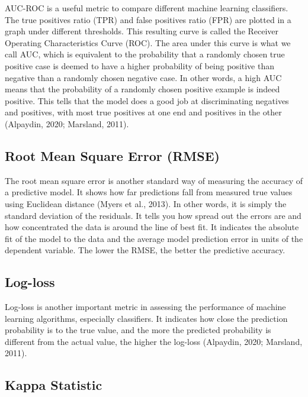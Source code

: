 \documentclass[
  jou]{apa6}
\begin{document}
AUC-ROC is a useful metric to compare different machine learning classifiers.
The true positives ratio (TPR) and false positives ratio (FPR) are plotted in a graph under different thresholds.
This resulting curve is called the Receiver Operating Characteristics Curve (ROC).
The area under this curve is what we call AUC, which is equivalent to the probability that a randomly chosen true positive case is deemed to have a higher probability of being positive than negative than a randomly chosen negative case.
In other words, a high AUC means that the probability of a randomly chosen positive example is indeed positive.
This tells that the model does a good job at discriminating negatives and positives, with most true positives at one end and positives in the other (Alpaydin, 2020; Marsland, 2011).

\hypertarget{root-mean-square-error-rmse}{%
\subsection{Root Mean Square Error (RMSE)}\label{root-mean-square-error-rmse}}

The root mean square error is another standard way of measuring the accuracy of a predictive model.
It shows how far predictions fall from measured true values using Euclidean distance (Myers et al., 2013).
In other words, it is simply the standard deviation of the residuals.
It tells you how spread out the errors are and how concentrated the data is around the line of best fit.
It indicates the absolute fit of the model to the data and the average model prediction error in units of the dependent variable.
The lower the RMSE, the better the predictive accuracy.

\hypertarget{log-loss}{%
\subsection{Log-loss}\label{log-loss}}

Log-loss is another important metric in assessing the performance of machine learning algorithms, especially classifiers.
It indicates how close the prediction probability is to the true value, and the more the predicted probability is different from the actual value, the higher the log-loss (Alpaydin, 2020; Marsland, 2011).

\hypertarget{kappa-statistic}{%
\subsection{Kappa Statistic}\label{kappa-statistic}}
\end{document}
